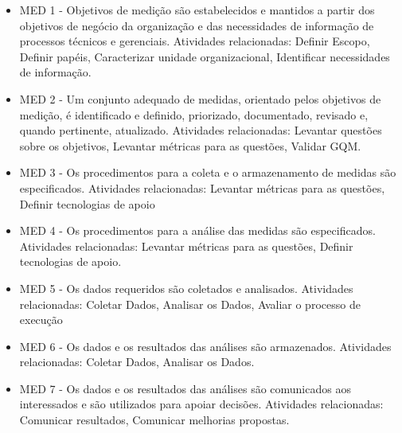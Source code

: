 \begin{itemize}
\item MED 1 - Objetivos   de  medição   são   estabelecidos   e  mantidos  a  partir   dos 
objetivos   de   negócio   da   organização   e   das   necessidades   de informação de processos técnicos e gerenciais.
\subitem Atividades relacionadas: Definir Escopo, Definir papéis, Caracterizar unidade organizacional, Identificar necessidades de informação.
\item MED 2 - Um  conjunto  adequado  de  medidas,  orientado  pelos  objetivos  de medição,  é  identificado  e  definido,  priorizado,  documentado,  revisado e, quando pertinente, atualizado. 
\subitem Atividades relacionadas: Levantar questões sobre os objetivos, Levantar métricas para as questões, Validar GQM.
\item MED 3 - Os  procedimentos  para  a  coleta  e  o  armazenamento  de  medidas  são especificados.
\subitem Atividades relacionadas: Levantar métricas para as questões,  Definir tecnologias de apoio
\item MED 4 - Os procedimentos para a análise das medidas são especificados.
\subitem Atividades relacionadas: Levantar métricas para as questões, Definir tecnologias de apoio.
\item MED 5 - Os dados requeridos são coletados e analisados.
\subitem Atividades relacionadas: Coletar Dados, Analisar os Dados, Avaliar o processo de execução
\item MED 6 - Os dados e os resultados das análises são armazenados. 
\subitem Atividades relacionadas: Coletar Dados, Analisar os Dados.
\item MED 7 - Os   dados   e   os   resultados   das   análises   são   comunicados   aos interessados e são utilizados para apoiar decisões.
\subitem Atividades relacionadas: Comunicar resultados, Comunicar melhorias propostas.

\end{itemize}